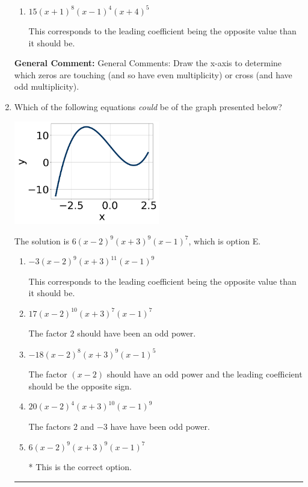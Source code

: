 \documentclass{extbook}[14pt]
\newcommand{\litem}[1]{\item #1

\rule{\textwidth}{0.4pt}}
\begin{document}
\begin{enumerate}
{\begin{enumerate}[label=\Alph*.]
* This is the correct option.
\item \( 15(x + 1)^{8} (x - 1)^{4} (x + 4)^{5} \)

This corresponds to the leading coefficient being the opposite value than it should be.
\end{enumerate}

\textbf{General Comment:} General Comments: Draw the x-axis to determine which zeros are touching (and so have even multiplicity) or cross (and have odd multiplicity).
}
\litem{
Which of the following equations \textit{could} be of the graph presented below?

\begin{center}
    \includegraphics[width=0.5\textwidth]{../Figures/polyGraphToFunctionB.png}
\end{center}




The solution is \( 6(x - 2)^{9} (x + 3)^{9} (x - 1)^{7} \), which is option E.\begin{enumerate}[label=\Alph*.]
\item \( -3(x - 2)^{9} (x + 3)^{11} (x - 1)^{9} \)

This corresponds to the leading coefficient being the opposite value than it should be.
\item \( 17(x - 2)^{10} (x + 3)^{7} (x - 1)^{7} \)

The factor $2$ should have been an odd power.
\item \( -18(x - 2)^{8} (x + 3)^{9} (x - 1)^{5} \)

The factor $(x - 2)$ should have an odd power and the leading coefficient should be the opposite sign.
\item \( 20(x - 2)^{4} (x + 3)^{10} (x - 1)^{9} \)

The factors $2$ and $-3$ have have been odd power.
\item \( 6(x - 2)^{9} (x + 3)^{9} (x - 1)^{7} \)

* This is the correct option.
\end{enumerate}

}
\end{enumerate}
\end{document}
